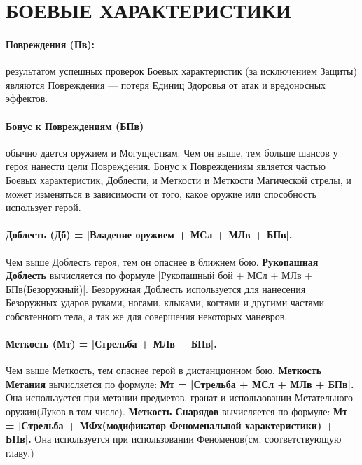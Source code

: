 \section{БОЕВЫЕ ХАРАКТЕРИСТИКИ}
\paragraph{Повреждения (Пв):} результатом успешных проверок Боевых характеристик (за исключением Защиты) являются Повреждения — потеря Единиц Здоровья от атак и вредоносных эффектов.
\paragraph{Бонус к Повреждениям (БПв)} обычно дается оружием и Могуществам. Чем он выше, тем больше шансов у героя нанести цели Повреждения. Бонус к Повреждениям является частью Боевых характеристик, Доблести, и Меткости и Меткости Магической стрелы, и может изменяться в зависимости от того, какое оружие или способность использует герой.
\paragraph{Доблесть (Дб) = |Владение оружием + МСл + МЛв + БПв|.} Чем выше Доблесть героя, тем он опаснее в ближнем бою.
\newline \textbf{Рукопашная Доблесть} вычисляется по формуле |Рукопашный бой + МСл + МЛв + БПв(Безоружный)|. Безоружная Доблесть используется для нанесения Безоружных ударов руками, ногами, клыками, когтями и другими частями собсвтенного тела, а так же для совершения некоторых маневров.
\paragraph{Меткость (Мт) = |Стрельба + МЛв + БПв|.} Чем выше Меткость, тем опаснее герой в дистанционном бою.
\newline \textbf{Меткость Метания} вычисляется по формуле: \textbf{Мт = |Стрельба + МСл + МЛв + БПв|.} Она используется при метании предметов, гранат и использовании Метательного оружия(Луков в том числе).
\newline \textbf{Меткость Снарядов} вычисляется по формуле: \textbf{Мт = |Стрельба + МФх(модификатор Феноменальной характеристики) + БПв|.} Она используется при использовании Феноменов(см. соответствующую главу.)

